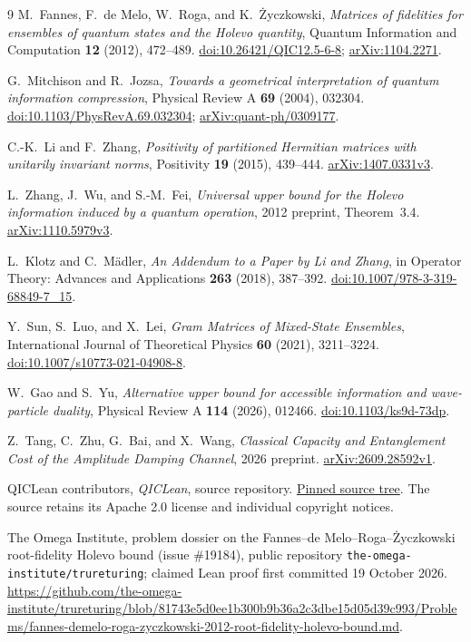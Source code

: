 \documentclass[11pt,a4paper]{article}
\begin{document}
\begin{thebibliography}{9}
M.~Fannes, F.~de Melo, W.~Roga, and K.~\.{Z}yczkowski,
\emph{Matrices of fidelities for ensembles of quantum states and the Holevo
quantity}, Quantum Information and Computation \textbf{12} (2012), 472--489.
\href{https://doi.org/10.26421/QIC12.5-6-8}{doi:10.26421/QIC12.5-6-8};
\href{https://arxiv.org/abs/1104.2271}{arXiv:1104.2271}.

G.~Mitchison and R.~Jozsa, \emph{Towards a geometrical interpretation of
quantum information compression}, Physical Review A \textbf{69} (2004),
032304. \href{https://doi.org/10.1103/PhysRevA.69.032304}{doi:10.1103/PhysRevA.69.032304};
\href{https://arxiv.org/abs/quant-ph/0309177}{arXiv:quant-ph/0309177}.

C.-K.~Li and F.~Zhang, \emph{Positivity of partitioned Hermitian matrices
with unitarily invariant norms}, Positivity \textbf{19} (2015), 439--444.
\href{https://arxiv.org/abs/1407.0331v3}{arXiv:1407.0331v3}.

L.~Zhang, J.~Wu, and S.-M.~Fei, \emph{Universal upper bound for the Holevo
information induced by a quantum operation}, 2012 preprint, Theorem~3.4.
\href{https://arxiv.org/abs/1110.5979v3}{arXiv:1110.5979v3}.

L.~Klotz and C.~M\"adler, \emph{An Addendum to a Paper by Li and Zhang},
in Operator Theory: Advances and Applications \textbf{263} (2018),
387--392. \href{https://doi.org/10.1007/978-3-319-68849-7_15}{doi:10.1007/978-3-319-68849-7\_15}.


Y.~Sun, S.~Luo, and X.~Lei, \emph{Gram Matrices of Mixed-State Ensembles},
International Journal of Theoretical Physics \textbf{60} (2021), 3211--3224.
\href{https://doi.org/10.1007/s10773-021-04908-8}{doi:10.1007/s10773-021-04908-8}.


W.~Gao and S.~Yu, \emph{Alternative upper bound for accessible information
and wave-particle duality}, Physical Review A \textbf{114} (2026), 012466.
\href{https://doi.org/10.1103/ks9d-73dp}{doi:10.1103/ks9d-73dp}.


Z.~Tang, C.~Zhu, G.~Bai, and X.~Wang, \emph{Classical Capacity and
Entanglement Cost of the Amplitude Damping Channel}, 2026 preprint.
\href{https://arxiv.org/abs/2609.28592v1}{arXiv:2609.28592v1}.

QICLean contributors, \emph{QICLean}, source repository.
\href{https://github.com/LionSR/QICLean/tree/acda92aa70e69b37507e422bceb5414036859fe6}{Pinned source tree}.
The source retains its Apache 2.0 license and individual copyright notices.

The Omega Institute, problem dossier on the Fannes--de Melo--Roga--\.{Z}yczkowski
root-fidelity Holevo bound (issue \#19184), public repository
\nolinkurl{the-omega-institute/trureturing}; claimed Lean proof first committed
19 October 2026.
\url{https://github.com/the-omega-institute/trureturing/blob/81743e5d0ee1b300b9b36a2c3dbe15d05d39c993/Problems/fannes-demelo-roga-zyczkowski-2012-root-fidelity-holevo-bound.md}.

\end{thebibliography}
\end{document}
